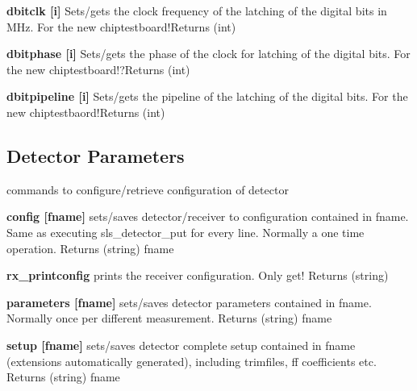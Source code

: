 \begin{DoxyItemize}
\item {\bfseries dbitclk \mbox{[}i\mbox{]}} Sets/gets the clock frequency of the latching of the digital bits in MHz. For the new chiptestboard!{\ttfamily Returns} {\ttfamily }(int)
\end{DoxyItemize}


\begin{DoxyItemize}
\item {\bfseries dbitphase \mbox{[}i\mbox{]}} Sets/gets the phase of the clock for latching of the digital bits. For the new chiptestboard!?{\ttfamily Returns} {\ttfamily }(int)
\end{DoxyItemize}


\begin{DoxyItemize}
\item {\bfseries dbitpipeline \mbox{[}i\mbox{]}} Sets/gets the pipeline of the latching of the digital bits. For the new chiptestbaord!{\ttfamily Returns} {\ttfamily }(int)
\end{DoxyItemize}\hypertarget{config_configsettings}{}\subsection{Detector Parameters}\label{config_configsettings}
commands to configure/retrieve configuration of detector


\begin{DoxyItemize}
\item {\bfseries config \mbox{[}fname\mbox{]}} sets/saves detector/receiver to configuration contained in fname. Same as executing sls\_\-detector\_\-put for every line. Normally a one time operation. {\ttfamily Returns} {\ttfamily }(string) fname
\end{DoxyItemize}


\begin{DoxyItemize}
\item {\bfseries rx\_\-printconfig} prints the receiver configuration. Only get! {\ttfamily Returns} {\ttfamily }(string)
\end{DoxyItemize}


\begin{DoxyItemize}
\item {\bfseries parameters \mbox{[}fname\mbox{]}} sets/saves detector parameters contained in fname. Normally once per different measurement. {\ttfamily Returns} {\ttfamily }(string) fname
\end{DoxyItemize}


\begin{DoxyItemize}
\item {\bfseries setup \mbox{[}fname\mbox{]}} sets/saves detector complete setup contained in fname (extensions automatically generated), including trimfiles, ff coefficients etc. {\ttfamily Returns} {\ttfamily }(string) fname 
\end{DoxyItemize}